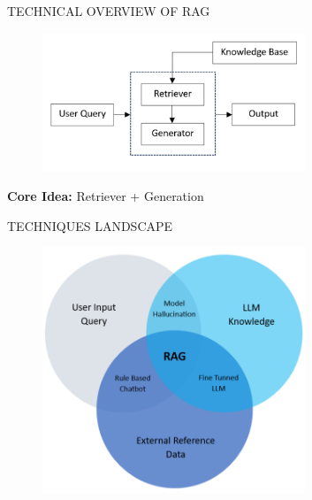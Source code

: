\documentclass{beamer}
\begin{document}
\begin{frame}{TECHNICAL OVERVIEW OF RAG}
    \begin{figure}
    \includegraphics[width=0.7\textwidth]{F1.png}
    \end{figure}

    \begin{center}
            \textbf{Core Idea:} Retriever + Generation 

    \end{center}

\end{frame}



\begin{frame}{TECHNIQUES LANDSCAPE}
    \begin{figure}
    \includegraphics[width=0.7\textwidth]{F2.png}
        
    \end{figure}
    
\end{frame}
\end{document}
